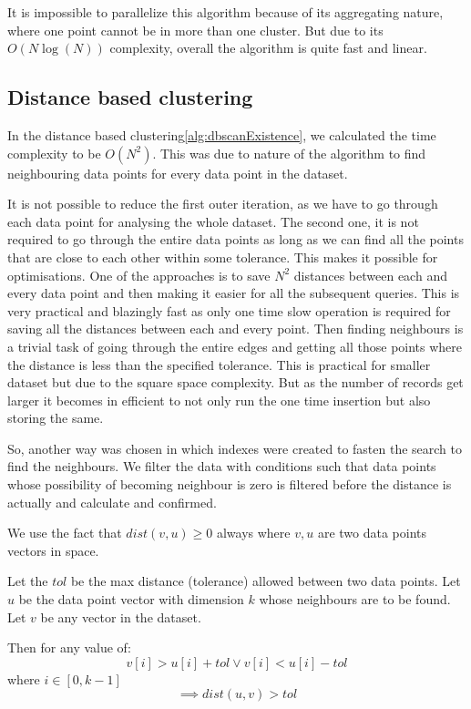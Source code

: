 It is impossible to parallelize this algorithm because of its aggregating nature, where one point cannot be in more than one cluster. But due to its \(O(N\log(N))\) complexity, overall the algorithm is quite fast and linear.

\subsection{Distance based clustering}

In the distance based clustering\ref{alg:dbscanExistence}, we calculated the time complexity to be \(O(N^2)\). This was due to nature of the algorithm to find neighbouring data points for every data point in the dataset. 

It is not possible to reduce the first outer iteration, as we have to go through each data point for analysing the whole dataset. The second one, it is not required to go through the entire data points as long as we can find all the points that are close to each other within some tolerance. This makes it possible for optimisations. One of the approaches is to save \(N^2\) distances between each and every data point and then making it easier for all the subsequent queries. This is very practical and blazingly fast as only one time slow operation is required for saving all the distances between each and every point. Then finding neighbours is a trivial task of going through the entire edges and getting all those points where the distance is less than the specified tolerance. This is practical for smaller dataset but due to the square space complexity. But as the number of records get larger it becomes in efficient to not only run the one time insertion but also storing the same.

So, another way was chosen in which indexes were created to fasten the search to find the neighbours. We filter the data with conditions such that data points whose possibility of becoming neighbour is zero is filtered before the distance is actually and calculate and confirmed.

We use the fact that \(dist(v, u) \geq 0\) always where \(v, u\) are two data points vectors in space. 

Let the \(tol\) be the max distance (tolerance) allowed between two data points. 
Let \(u\) be the data point vector with dimension \(k\) whose neighbours are to be found.
Let \(v\) be any vector in the dataset.

Then for any value of:
\[v[i] > u[i] + tol \vee v[i] < u[i] - tol\] where \(i \in [0, k-1]\)
\[\implies dist(u, v) > tol\]

